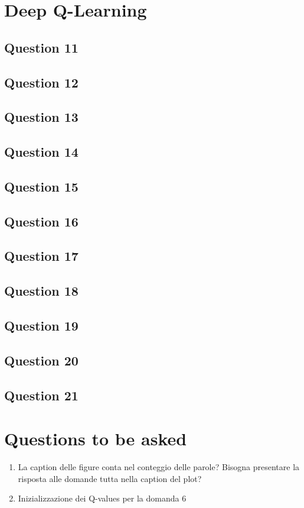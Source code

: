 \documentclass[10pt]{IEEEtran}
\begin{document}
\section{Deep Q-Learning}
\subsection*{Question 11}
\subsection*{Question 12}
\subsection*{Question 13}
\subsection*{Question 14}
\subsection*{Question 15}
\subsection*{Question 16}
\subsection*{Question 17}
\subsection*{Question 18}
\subsection*{Question 19}
\subsection*{Question 20}
\subsection*{Question 21}

\section*{Questions to be asked}
\begin{enumerate}
    \item La caption delle figure conta nel conteggio delle parole? Bisogna presentare la risposta alle domande tutta nella caption del plot?
    \item Inizializzazione dei Q-values per la domanda 6 
\end{enumerate}


\nocite{*}
\printbibliography

\clearpage
{}
\end{document}
